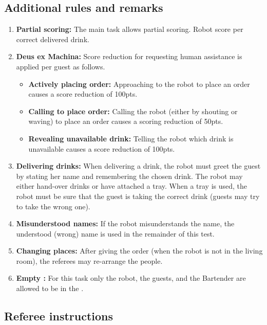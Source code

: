 \subsection*{Additional rules and remarks}
\begin{enumerate}
	\item \textbf{Partial scoring:} The main task allows partial scoring.
	Robot score per correct delivered drink.

	\item \textbf{Deus ex Machina:} Score reduction for requesting human assistance is applied per guest as follows.
	\begin{itemize}[nosep]
		\item \textbf{Actively placing order:} Approaching to the robot to place an order causes a score reduction of 100pts.

		\item \textbf{Calling to place order:} Calling the robot (either by shouting or waving) to place an order causes a scoring reduction of 50pts.

		\item \textbf{Revealing unavailable drink:} Telling the robot which drink is unavailable causes a score reduction of 100pts.
	\end{itemize}

	\item \textbf{Delivering drinks:} When delivering a drink, the robot must greet the guest by stating her name and remembering the chosen drink.
	The robot may either hand-over drinks or have attached a tray.
	When a tray is used, the robot must be sure that the guest is taking the correct drink (guests may try to take the wrong one).

	\item \textbf{Misunderstood names:} If the robot misunderstands the name, the understood (wrong) name is used in the remainder of this test.

	\item \textbf{Changing places:} After giving the order (when the robot is not in the living room), the referees may re-arrange the people.

	\item \textbf{Empty \Arena{}:} For this task only the robot, the guests, and the Bartender are allowed to be in the \Arena{}.
\end{enumerate}

\subsection*{Referee instructions}

